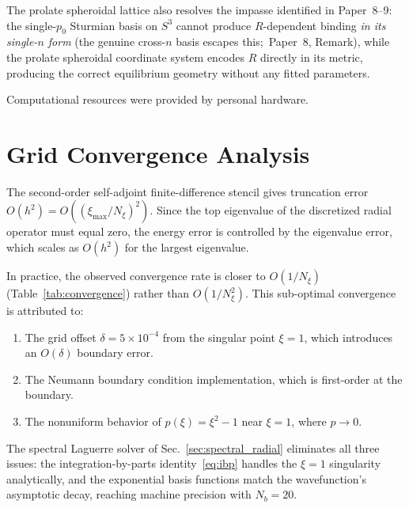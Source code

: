 \documentclass[aps,pra,twocolumn,superscriptaddress,longbibliography]{revtex4-2}
\begin{document}
The prolate spheroidal lattice also resolves the impasse identified
in Paper~8--9: the single-$p_0$ Sturmian basis on $S^3$ cannot
produce $R$-dependent binding \emph{in its single-$n$ form} (the genuine
cross-$n$ basis escapes this;\ Paper~8, Remark), while the prolate spheroidal coordinate
system encodes $R$ directly in its metric, producing the correct
equilibrium geometry without any fitted parameters.


\begin{acknowledgments}
Computational resources were provided by personal hardware.
\end{acknowledgments}


\appendix

\section{Grid Convergence Analysis}
\label{app:convergence}

The second-order self-adjoint finite-difference stencil gives
truncation error $O(h^2) = O((\xi_{\max}/N_\xi)^2)$.  Since the
top eigenvalue of the discretized radial operator must equal zero,
the energy error is controlled by the eigenvalue error, which
scales as $O(h^2)$ for the largest eigenvalue.

In practice, the observed convergence rate is closer to $O(1/N_\xi)$
(Table~\ref{tab:convergence}) rather than $O(1/N_\xi^2)$.  This
sub-optimal convergence is attributed to:
\begin{enumerate}
  \item The grid offset $\delta = 5 \times 10^{-4}$ from the
    singular point $\xi = 1$, which introduces an $O(\delta)$
    boundary error.
  \item The Neumann boundary condition implementation, which is
    first-order at the boundary.
  \item The nonuniform behavior of $p(\xi) = \xi^2 - 1$ near
    $\xi = 1$, where $p \to 0$.
\end{enumerate}

The spectral Laguerre solver of Sec.~\ref{sec:spectral_radial}
eliminates all three issues: the integration-by-parts
identity~\eqref{eq:ibp} handles the $\xi = 1$ singularity
analytically, and the exponential basis functions match the
wavefunction's asymptotic decay, reaching machine precision
with $N_b = 20$.
\end{document}
